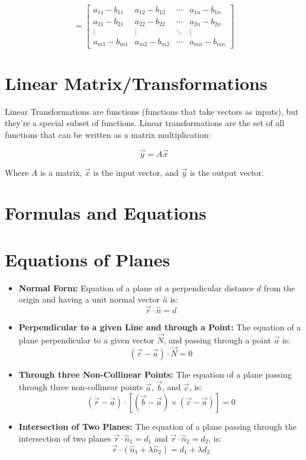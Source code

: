 \documentclass{article}
\begin{document}
\[
= \begin{bmatrix} 
a_{11}-b_{11} & a_{12}-b_{12} & \cdots & a_{1n}-b_{1n} \\
a_{21}-b_{21} & a_{22}-b_{22} & \cdots & a_{2n}-b_{2n} \\
\vdots & \vdots & \ddots & \vdots \\
a_{m1}-b_{m1} & a_{m2}-b_{m2} & \cdots & a_{mn}-b_{mn}
\end{bmatrix}
\]

\section{Linear Matrix/Transformations}
Linear Transformations are functions (functions that take vectors as inputs), but they're a special subset of functions. Linear transformations are the set of all functions that can be written as a matrix multiplication:

\begin{equation}
  \vec{y} = A\vec{x}
  \label{eq:linear_transformation}
\end{equation}

Where $A$ is a matrix, $\vec{x}$ is the input vector, and $\vec{y}$ is the output vector.

\section{Formulas and Equations}

\section{Equations of Planes}

\begin{itemize}
    \item \textbf{Normal Form:} Equation of a plane at a perpendicular distance $d$ from the origin and having a unit normal vector $\hat{n}$ is:
    \[
    \vec{r} \cdot \hat{n} = d
    \]

    \item \textbf{Perpendicular to a given Line and through a Point:} The equation of a plane perpendicular to a given vector $\vec{N}$, and passing through a point $\vec{a}$ is:
    \[
    (\vec{r} - \vec{a}) \cdot \vec{N} = 0
    \]

    \item \textbf{Through three Non-Collinear Points:} The equation of a plane passing through three non-collinear points $\vec{a}$, $\vec{b}$, and $\vec{c}$, is:
    \[
    (\vec{r} - \vec{a}) \cdot [(\vec{b} - \vec{a}) \times (\vec{c} - \vec{a})] = 0
    \]

    \item \textbf{Intersection of Two Planes:} The equation of a plane passing through the intersection of two planes $\vec{r} \cdot \hat{n}_1 = d_1$ and $\vec{r} \cdot \hat{n}_2 = d_2$, is:
    \[
    \vec{r} \cdot (\hat{n}_1 + \lambda \hat{n}_2) = d_1 + \lambda d_2
    \]
\end{itemize}
\end{document}
